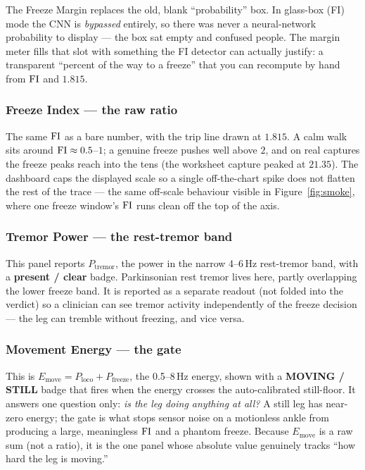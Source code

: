 \begin{keyidea}
The Freeze Margin replaces the old, blank ``probability'' box. In glass-box (FI) mode
the CNN is \emph{bypassed} entirely, so there was never a neural-network probability to
display --- the box sat empty and confused people. The margin meter fills that slot with
something the FI detector can actually justify: a transparent ``percent of the way to a
freeze'' that you can recompute by hand from $\mathrm{FI}$ and $1.815$.
\end{keyidea}

\subsubsection*{Freeze Index --- the raw ratio}

The same $\mathrm{FI}$ as a bare number, with the trip line drawn at $1.815$. A calm walk sits
around $\mathrm{FI}\approx 0.5$--$1$; a genuine freeze pushes well above $2$, and on real
captures the freeze peaks reach into the tens (the worksheet capture peaked at $21.35$).
The dashboard caps the displayed scale so a single off-the-chart spike does not flatten
the rest of the trace --- the same off-scale behaviour visible in
Figure~\ref{fig:smoke}, where one freeze window's $\mathrm{FI}$ runs clean off the top of the
axis.

\subsubsection*{Tremor Power --- the rest-tremor band}

This panel reports $P_{\text{tremor}}$, the power in the narrow 4--6\,Hz rest-tremor band,
with a \textbf{present / clear} badge. Parkinsonian rest tremor lives here, partly
overlapping the lower freeze band. It is reported as a separate readout (not folded into
the verdict) so a clinician can see tremor activity independently of the freeze decision
--- the leg can tremble without freezing, and vice versa.

\subsubsection*{Movement Energy --- the gate}

This is $E_{\text{move}} = P_{\text{loco}}+P_{\text{freeze}}$, the 0.5--8\,Hz energy,
shown with a \textbf{MOVING / STILL} badge that fires when the energy crosses the
auto-calibrated still-floor. It answers one question only: \emph{is the leg doing
anything at all?} A still leg has near-zero energy; the gate is what stops sensor noise
on a motionless ankle from producing a large, meaningless $\mathrm{FI}$ and a phantom freeze.
Because $E_{\text{move}}$ is a raw sum (not a ratio), it is the one panel whose absolute
value genuinely tracks ``how hard the leg is moving.''

